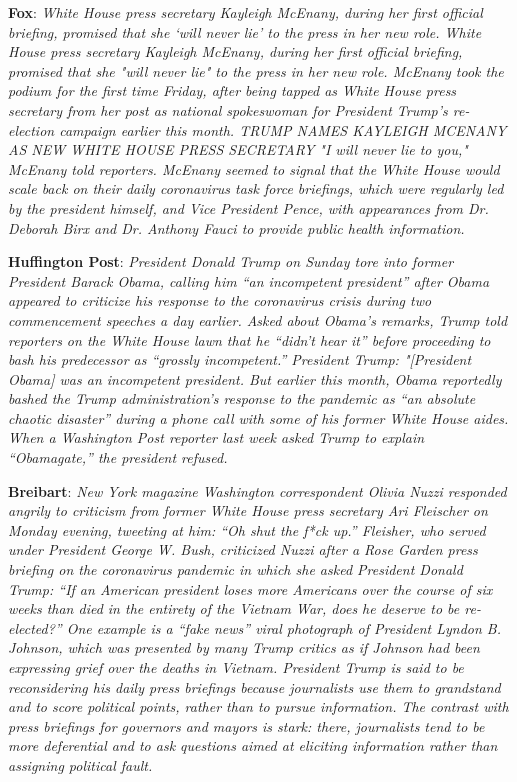 \documentclass[11pt]{article}
\begin{document}
\textbf{Fox}: \emph{White House press secretary Kayleigh McEnany, during her first official briefing, promised that she ‘will never lie’ to the press in her new role. White House press secretary Kayleigh McEnany, during her first official briefing, promised that she "will never lie" to the press in her new role. McEnany took the podium for the first time Friday, after being tapped as White House press secretary from her post as national spokeswoman for President Trump's re-election campaign earlier this month. TRUMP NAMES KAYLEIGH MCENANY AS NEW WHITE HOUSE PRESS SECRETARY "I will never lie to you," McEnany told reporters. McEnany seemed to signal that the White House would scale back on their daily coronavirus task force briefings, which were regularly led by the president himself, and Vice President Pence, with appearances from Dr. Deborah Birx and Dr. Anthony Fauci to provide public health information.}

\textbf{Huffington Post}: \emph{President Donald Trump on Sunday tore into former President Barack Obama, calling him “an incompetent president” after Obama appeared to criticize his response to the coronavirus crisis during two commencement speeches a day earlier. Asked about Obama’s remarks, Trump told reporters on the White House lawn that he “didn’t hear it” before proceeding to bash his predecessor as “grossly incompetent.” President Trump: "[President Obama] was an incompetent president. But earlier this month, Obama reportedly bashed the Trump administration’s response to the pandemic as “an absolute chaotic disaster” during a phone call with some of his former White House aides. When a Washington Post reporter last week asked Trump to explain “Obamagate,” the president refused.}

\textbf{Breibart}: \emph{New York magazine Washington correspondent Olivia Nuzzi responded angrily to criticism from former White House press secretary Ari Fleischer on Monday evening, tweeting at him: “Oh shut the f*ck up.” Fleisher, who served under President George W. Bush, criticized Nuzzi after a Rose Garden press briefing on the coronavirus pandemic in which she asked President Donald Trump: “If an American president loses more Americans over the course of six weeks than died in the entirety of the Vietnam War, does he deserve to be re-elected?” One example is a “fake news” viral photograph of President Lyndon B. Johnson, which was presented by many Trump critics as if Johnson had been expressing grief over the deaths in Vietnam. President Trump is said to be reconsidering his daily press briefings because journalists use them to grandstand and to score political points, rather than to pursue information. The contrast with press briefings for governors and mayors is stark: there, journalists tend to be more deferential and to ask questions aimed at eliciting information rather than assigning political fault.}
\end{document}
